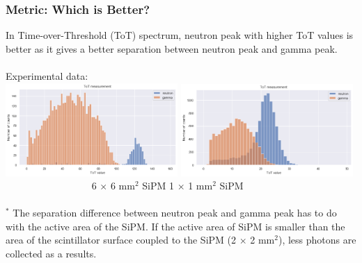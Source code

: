 \documentclass[xcolor=x11names, compress, handout]{beamer}
\renewcommand{\(}{\begin{columns}}
\renewcommand{\)}{\end{columns}}
\newcommand{\<}[1]{\begin{column}{#1}}
\renewcommand{\>}{\end{column}}
\begin{document}
\begin{frame}
  \frametitle{Metric: Which is Better?}
  \scriptsize
  In Time-over-Threshold (ToT) spectrum, neutron peak with higher ToT values is better as it gives a better separation between neutron peak and gamma peak. \\
  \ \\
  Experimental data: \\
  \centering 
  \includegraphics[width=0.49\textwidth, height=0.49\textheight]{images/roughness3.png}
  \includegraphics[width=0.49\textwidth, height=0.49\textheight]{images/spectra3.png}
  \flushleft~~~~~~~~~~~~~~~~~ 6 $\times$ 6 mm$^2$ SiPM \hspace{4cm} 1 $\times$ 1 mm$^2$ SiPM \\
  \ \\
  $^*$ The separation difference between neutron peak and gamma peak has to do with the active area of the SiPM. If the active area of SiPM is smaller than the area of the scintillator surface coupled to the SiPM (2 $\times$ 2 mm$^2$), less photons are collected as a results.  
\end{frame}
\end{document}
